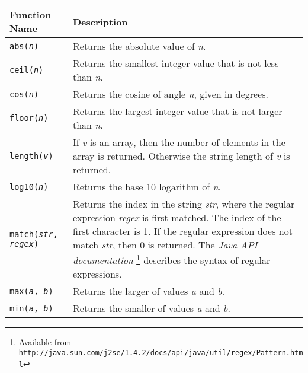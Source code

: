 \begin{table}[htb]
\begin{tabular}{|l|p{7cm}|}
\hline
Function Name & Description \\
\hline
\hline

\texttt{abs(\textit{n})} &
Returns the absolute value of \textit{n}. \\

\hline

\texttt{ceil(\textit{n})} &
Returns the smallest integer value that is not less than \textit{n}. \\

\hline

\texttt{cos(\textit{n})} &
Returns the cosine of angle \textit{n}, given in degrees. \\

\hline

\texttt{floor(\textit{n})} &
Returns the largest integer value that is not larger than \textit{n}. \\

\hline

\texttt{length(\textit{v})} &
If \textit{v} is an array, then the number of elements in the
array is returned.  Otherwise the string length of \textit{v} is returned. \\

\hline

\texttt{log10(\textit{n})} &
Returns the base 10 logarithm of \textit{n}. \\

\hline

\texttt{match(\textit{str}, \textit{regex})} &
Returns the index in the string \textit{str}, where the regular expression
\textit{regex} is first matched.  The index of the first character is 1.
If the regular expression does not match \textit{str}, then 0 is returned.
The \textit{Java API documentation}
\footnote{Available from
\texttt{http://java.sun.com/j2se/1.4.2/docs/api/java/util/regex/Pattern.html}}
describes the syntax of regular expressions. \\

\hline

\texttt{max(\textit{a}, \textit{b})} &
Returns the larger of values \textit{a} and \textit{b}. \\

\hline

\texttt{min(\textit{a}, \textit{b})} &
Returns the smaller of values \textit{a} and \textit{b}. \\


\end{tabular}
\end{table}
